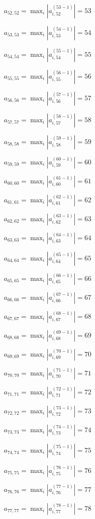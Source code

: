 \documentclass[a4paper,12pt]{article}
\begin{document}
$a _{ 52, 52 } =  \max _i |a _{ i, 52 } ^{ (53 - 1) } | = 53$

$a _{ 53, 53 } =  \max _i |a _{ i, 53 } ^{ (54 - 1) } | = 54$

$a _{ 54, 54 } =  \max _i |a _{ i, 54 } ^{ (55 - 1) } | = 55$

$a _{ 55, 55 } =  \max _i |a _{ i, 55 } ^{ (56 - 1) } | = 56$

$a _{ 56, 56 } =  \max _i |a _{ i, 56 } ^{ (57 - 1) } | = 57$

$a _{ 57, 57 } =  \max _i |a _{ i, 57 } ^{ (58 - 1) } | = 58$

$a _{ 58, 58 } =  \max _i |a _{ i, 58 } ^{ (59 - 1) } | = 59$

$a _{ 59, 59 } =  \max _i |a _{ i, 59 } ^{ (60 - 1) } | = 60$

$a _{ 60, 60 } =  \max _i |a _{ i, 60 } ^{ (61 - 1) } | = 61$

$a _{ 61, 61 } =  \max _i |a _{ i, 61 } ^{ (62 - 1) } | = 62$

$a _{ 62, 62 } =  \max _i |a _{ i, 62 } ^{ (63 - 1) } | = 63$

$a _{ 63, 63 } =  \max _i |a _{ i, 63 } ^{ (64 - 1) } | = 64$

$a _{ 64, 64 } =  \max _i |a _{ i, 64 } ^{ (65 - 1) } | = 65$

$a _{ 65, 65 } =  \max _i |a _{ i, 65 } ^{ (66 - 1) } | = 66$

$a _{ 66, 66 } =  \max _i |a _{ i, 66 } ^{ (67 - 1) } | = 67$

$a _{ 67, 67 } =  \max _i |a _{ i, 67 } ^{ (68 - 1) } | = 68$

$a _{ 68, 68 } =  \max _i |a _{ i, 68 } ^{ (69 - 1) } | = 69$

$a _{ 69, 69 } =  \max _i |a _{ i, 69 } ^{ (70 - 1) } | = 70$

$a _{ 70, 70 } =  \max _i |a _{ i, 70 } ^{ (71 - 1) } | = 71$

$a _{ 71, 71 } =  \max _i |a _{ i, 71 } ^{ (72 - 1) } | = 72$

$a _{ 72, 72 } =  \max _i |a _{ i, 72 } ^{ (73 - 1) } | = 73$

$a _{ 73, 73 } =  \max _i |a _{ i, 73 } ^{ (74 - 1) } | = 74$

$a _{ 74, 74 } =  \max _i |a _{ i, 74 } ^{ (75 - 1) } | = 75$

$a _{ 75, 75 } =  \max _i |a _{ i, 75 } ^{ (76 - 1) } | = 76$

$a _{ 76, 76 } =  \max _i |a _{ i, 76 } ^{ (77 - 1) } | = 77$

$a _{ 77, 77 } =  \max _i |a _{ i, 77 } ^{ (78 - 1) } | = 78$
\end{document}
